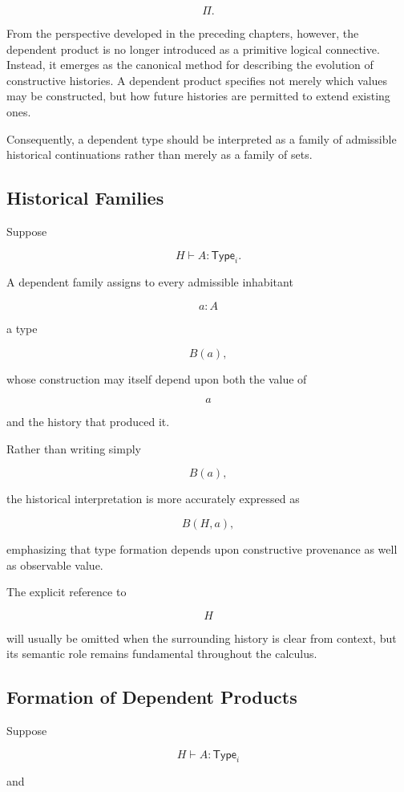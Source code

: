 \documentclass[12pt,oneside]{article}
\theoremstyle{definition}
\theoremstyle{remark}
\newcommand{\Type}{\mathsf{Type}}
\begin{document}
\[
\Pi.
\]

From the perspective developed in the preceding chapters, however, the
dependent product is no longer introduced as a primitive logical connective.
Instead, it emerges as the canonical method for describing the evolution of
constructive histories. A dependent product specifies not merely which values
may be constructed, but how future histories are permitted to extend existing
ones.

Consequently, a dependent type should be interpreted as a family of admissible
historical continuations rather than merely as a family of sets.

\subsection{Historical Families}

Suppose

\[
H \vdash A : \Type_i.
\]

A dependent family assigns to every admissible inhabitant

\[
a:A
\]

a type

\[
B(a),
\]

whose construction may itself depend upon both the value of

\[
a
\]

and the history that produced it.

Rather than writing simply

\[
B(a),
\]

the historical interpretation is more accurately expressed as

\[
B(H,a),
\]

emphasizing that type formation depends upon constructive provenance as well as
observable value.

The explicit reference to

\[
H
\]

will usually be omitted when the surrounding history is clear from context, but
its semantic role remains fundamental throughout the calculus.

\subsection{Formation of Dependent Products}

Suppose

\[
H
\vdash
A:\Type_i
\]

and
\end{document}
